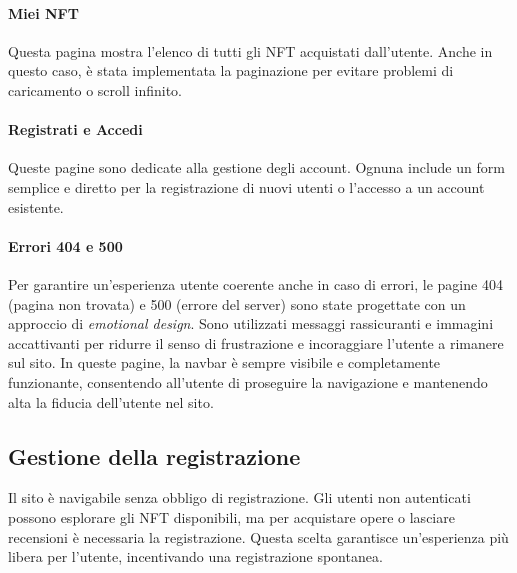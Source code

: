 \documentclass[10pt]{article}
\begin{document}
\paragraph{Miei NFT}
Questa pagina mostra l’elenco di tutti gli NFT acquistati dall’utente. Anche in questo caso, è stata implementata la paginazione per evitare problemi di caricamento o scroll infinito.

\paragraph{Registrati e Accedi} Queste pagine sono dedicate alla gestione degli account. Ognuna include un form semplice e diretto per la registrazione di nuovi utenti o l’accesso a un account esistente.

\paragraph{Errori 404 e 500} Per garantire un’esperienza utente coerente anche in caso di errori, le pagine 404 (pagina non trovata) e 500 (errore del server) sono state progettate con un approccio di \textit{emotional design}. Sono utilizzati messaggi rassicuranti e immagini accattivanti per ridurre il senso di frustrazione e incoraggiare l’utente a rimanere sul sito. In queste pagine, la navbar è sempre visibile e completamente funzionante, consentendo all’utente di proseguire la navigazione e mantenendo alta la fiducia dell’utente nel sito.

\subsection{Gestione della registrazione}
Il sito è navigabile senza obbligo di registrazione. Gli utenti non autenticati possono esplorare gli NFT disponibili, ma per acquistare opere o lasciare recensioni è necessaria la registrazione. Questa scelta garantisce un’esperienza più libera per l'utente, incentivando una registrazione spontanea.
\end{document}
